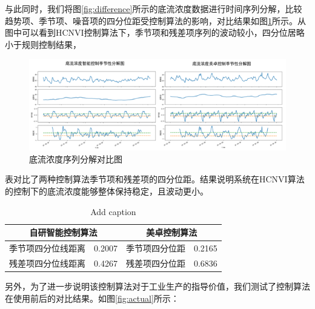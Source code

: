 与此同时，我们将图\ref{fig:difference}所示的底流浓度数据进行时间序列分解，比较趋势项、季节项、噪音项的四分位距受控制算法的影响，对比结果如图\ref{fig:decompose}所示。从图中可以看到HCNVI控制算法下，季节项和残差项序列的波动较小，四分位居略小于规则控制结果，
\begin{figure}[ht]
  \centering
  \includegraphics[width=\linewidth]{figures/chapter6/season.png}
  \caption{底流浓度序列分解对比图}
  \label{fig:decompose}
\end{figure}
表对比了两种控制算法季节项和残差项的四分位距。结果说明系统在HCNVI算法的控制下的底流浓度能够整体保持稳定，且波动更小。
\begin{table}[htbp]
  \centering
  \caption{Add caption}
    \begin{tabular}{cccc}
    \toprule
    \multicolumn{2}{c}{\textbf{自研智能控制算法}} & \multicolumn{2}{c}{\textbf{美卓控制算法}} \\
    \midrule
    季节项四分位线距离 & 0.2007 & 季节项四分位距 & 0.2165 \\
    \midrule
    残差项四分位线距离 & 0.4267 & 残差项四分位距 & 0.6836 \\
    \bottomrule
    \end{tabular}%
  \label{tab:dis_decompose}%
\end{table}%

另外，为了进一步说明该控制算法对于工业生产的指导价值，我们测试了控制算法在使用前后的对比结果。如图\ref{fig:actual}所示：

